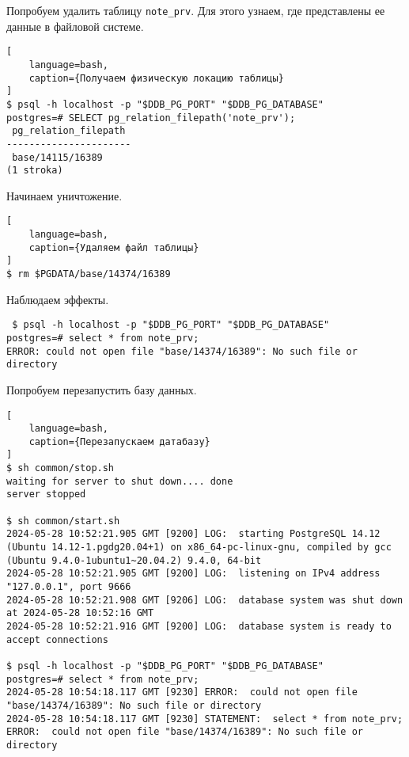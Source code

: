 \documentclass{article}
\begin{document}
Попробуем удалить таблицу \texttt{note\_prv}. Для этого узнаем, где представлены ее данные в файловой системе.

\begin{lstlisting}[
    language=bash,
    caption={Получаем физическую локацию таблицы}
]
$ psql -h localhost -p "$DDB_PG_PORT" "$DDB_PG_DATABASE"
postgres=# SELECT pg_relation_filepath('note_prv');
 pg_relation_filepath 
----------------------
 base/14115/16389
(1 stroka)
\end{lstlisting}

Начинаем уничтожение.

\begin{lstlisting}[
    language=bash,
    caption={Удаляем файл таблицы}
]
$ rm $PGDATA/base/14374/16389

\end{lstlisting}

Наблюдаем эффекты.

\texttt{
    \$ psql -h localhost -p "\$DDB\_PG\_PORT" "\$DDB\_PG\_DATABASE" \\
    postgres=\# select * from note\_prv; \\
    ERROR:  could not open file "base/14374/16389": No such file or directory \\
}

Попробуем перезапустить базу данных.

\begin{lstlisting}[
    language=bash,
    caption={Перезапускаем датабазу}
]
$ sh common/stop.sh
waiting for server to shut down.... done
server stopped

$ sh common/start.sh
2024-05-28 10:52:21.905 GMT [9200] LOG:  starting PostgreSQL 14.12 (Ubuntu 14.12-1.pgdg20.04+1) on x86_64-pc-linux-gnu, compiled by gcc (Ubuntu 9.4.0-1ubuntu1~20.04.2) 9.4.0, 64-bit
2024-05-28 10:52:21.905 GMT [9200] LOG:  listening on IPv4 address "127.0.0.1", port 9666
2024-05-28 10:52:21.908 GMT [9206] LOG:  database system was shut down at 2024-05-28 10:52:16 GMT
2024-05-28 10:52:21.916 GMT [9200] LOG:  database system is ready to accept connections

$ psql -h localhost -p "$DDB_PG_PORT" "$DDB_PG_DATABASE"
postgres=# select * from note_prv;
2024-05-28 10:54:18.117 GMT [9230] ERROR:  could not open file "base/14374/16389": No such file or directory
2024-05-28 10:54:18.117 GMT [9230] STATEMENT:  select * from note_prv;
ERROR:  could not open file "base/14374/16389": No such file or directory
\end{lstlisting}
\end{document}
